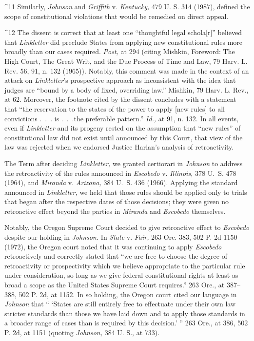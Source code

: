 {{{^11 Similarly, \emph{Johnson} and \emph{Griffith} v. \emph{Kentucky,} 479 U. S.
314 (1987), defined the scope of constitutional violations that would
be remedied on direct appeal.

^12 The dissent is correct that at least one ``thoughtful legal
schola[r]'' believed that \emph{Linkletter} did preclude States from
applying new constitutional rules more broadly than our cases required.
\emph{Post,} at 294 (citing Mishkin, Foreword: The High Court, The Great
Writ, and the Due Process of Time and Law, 79 Harv. L. Rev. 56, 91, n.
132 (1965)). Notably, this \newpage  comment was made in the context of
an attack on \emph{Linkletter}'s prospective approach as inconsistent
with the idea that judges are ``bound by a body of fixed, overriding
law.'' Mishkin, 79 Harv. L. Rev., at 62. Moreover, the footnote
cited by the dissent concludes with a statement that ``the reservation
to the states of the power to apply [new rules] to all convictions
.~.~. is .~.~.the preferable pattern.'' \emph{Id.,} at 91, n. 132.
In all events, even if \emph{Linkletter} and its progeny rested on the
assumption that ``new rules'' of constitutional law did not exist
until announced by this Court, that view of the law was rejected when we
endorsed Justice Harlan's analysis of retroactivity.

  The Term after deciding \emph{Linkletter,} we granted certiorari in
\emph{Johnson} to address the retroactivity of the rules announced
in \emph{Escobedo} v. \emph{Illinois,} 378 U.~S. 478 (1964), and
\emph{Miranda} v. \emph{Arizona,} 384 U.~S. 436 (1966). Applying the
standard announced in \emph{Linkletter,} we held that those rules should be
applied only to trials that began after the respective dates of those
decisions; they were given no retroactive effect beyond the parties in
\emph{Miranda} and \emph{Escobedo} themselves.\footnotemark[13]

  Notably, the Oregon Supreme Court decided to give retroactive effect
to \emph{Escobedo} despite our holding in \emph{Johnson.} In \emph{State} v.
\emph{Fair,} 263 Ore. 383, 502 P. 2d 1150 (1972), the Oregon court noted
that it was continuing to apply \emph{Escobedo} retroactively and correctly
stated that ``we are free to choose the degree of retroactivity or
prospectivity which we believe appropriate to the particular rule under
consideration, so long as we give federal constitutional rights at least
as broad a scope as the United States Supreme Court requires.'' 263
Ore., at 387--388, 502 P. 2d, at 1152. In so holding, the Ore\newpage gon
court cited our language in \emph{Johnson} that `` ‘States are still
entirely free to effectuate under their own law stricter standards than
those we have laid down and to apply those standards in a broader range
of cases than is required by this decision.' '' 263 Ore., at 386,
502 P. 2d, at 1151 (quoting \emph{Johnson,} 384 U. S., at 733).\footnotemark[14]

}}}
